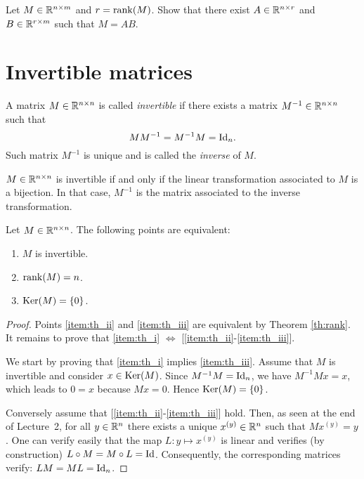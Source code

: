 \documentclass[11pt,nocut]{article}
\begin{document}
\begin{exercise}[Important]
	Let $M \in \mathbb{R}^{n \times m}$ and $r = {{\rm rank}}(M)$. Show that there exist $A \in \mathbb{R}^{n \times r}$ and $B \in \mathbb{R}^{r \times m}$ such that $M = AB$.
\end{exercise}

\section{Invertible matrices}

\begin{definition}\label{prop:matrix_inverse}
	A matrix $M \in \mathbb{R}^{n \times n}$ is called \emph{invertible} if there exists a matrix $M^{-1} \in \mathbb{R}^{n \times n}$ such that 
	$$
	M M^{-1} = M^{-1} M = {{\rm Id}}_n.
	$$
	Such matrix $M^{-1}$ is unique and is called the \emph{inverse} of $M$.
\end{definition}

\begin{remark}
	$M \in \mathbb{R}^{n \times n}$ is invertible if and only if the linear transformation associated to $M$ is a bijection. In that case, $M^{-1}$ is the matrix associated to the inverse transformation.
\end{remark}

\begin{theorem}
	Let $M \in \mathbb{R}^{n \times n}$. The following points are equivalent:
	\begin{enumerate}[label=(\roman*)]
		\item \label{item:th_i} $M$ is invertible.
		\item \label{item:th_ii} ${{\rm rank}}(M) = n$.
		\item \label{item:th_iii} ${{\rm Ker}}(M) = \{0\}$.
	\end{enumerate}
\end{theorem}
\begin{proof}
	Points \ref{item:th_ii} and \ref{item:th_iii} are equivalent by Theorem \ref{th:rank}. 
	It remains to prove that \ref{item:th_i} $\Leftrightarrow$ [\ref{item:th_ii}-\ref{item:th_iii}].

	We start by proving that \ref{item:th_i} implies \ref{item:th_iii}. Assume that $M$ is invertible and consider $x \in {{\rm Ker}}(M)$. Since $M^{-1} M = {{\rm Id}}_n$, we have $M^{-1} M x = x$, which leads to $0 = x$ because $Mx = 0$. Hence ${{\rm Ker}}(M) = \{0\}$.

	Conversely assume that [\ref{item:th_ii}-\ref{item:th_iii}] hold. Then, as seen at the end of Lecture~2, for all $y \in \mathbb{R}^n$ there exists a unique $x^{(y)}\in \mathbb{R}^n$ such that $Mx^{(y)} = y$. One can verify easily that the map $L: y \mapsto x^{(y)}$ is linear and verifies (by construction) $L \circ M = M \circ L = {{\rm Id}}$. Consequently, the corresponding matrices verify: $LM=ML={{\rm Id}}_n$.
\end{proof}
\end{document}
